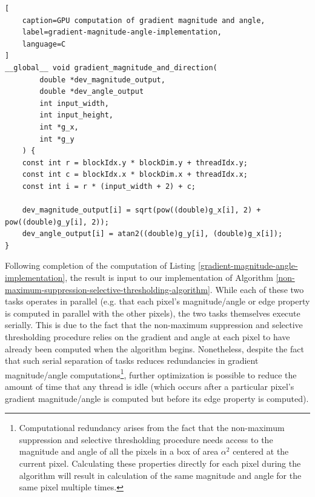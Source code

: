 \documentclass[journal]{IEEEtran}
\begin{document}
\begin{lstlisting}[
	caption=GPU computation of gradient magnitude and angle,
	label=gradient-magnitude-angle-implementation,
	language=C
]
__global__ void gradient_magnitude_and_direction(
		double *dev_magnitude_output,
		double *dev_angle_output
		int input_width,
		int input_height,
		int *g_x,
		int *g_y
	) {
	const int r = blockIdx.y * blockDim.y + threadIdx.y;
	const int c = blockIdx.x * blockDim.x + threadIdx.x;
	const int i = r * (input_width + 2) + c;
	
	dev_magnitude_output[i] = sqrt(pow((double)g_x[i], 2) + pow((double)g_y[i], 2));
	dev_angle_output[i] = atan2((double)g_y[i], (double)g_x[i]);
}
\end{lstlisting}
Following completion of the computation of Listing \ref{gradient-magnitude-angle-implementation}, the result is input to our implementation of Algorithm \ref{non-maximum-suppression-selective-thresholding-algorithm}. While each of these two tasks operates in parallel (e.g. that each pixel's magnitude/angle or edge property is computed in parallel with the other pixels), the two tasks themselves execute serially. This is due to the fact that the non-maximum suppression and selective thresholding procedure relies on the gradient and angle at each pixel to have already been computed when the algorithm begins. Nonetheless, despite the fact that such serial separation of tasks reduces redundancies in gradient magnitude/angle computations\footnote{Computational redundancy arises from the fact that the non-maximum suppression and selective thresholding procedure needs access to the magnitude and angle of all the pixels in a box of area $\alpha^2$ centered at the current pixel. Calculating these properties directly for each pixel during the algorithm will result in calculation of the same magnitude and angle for the same pixel multiple times.}, further optimization is possible to reduce the amount of time that any thread is idle (which occurs after a particular pixel's gradient magnitude/angle is computed but before its edge property is computed).
\end{document}
